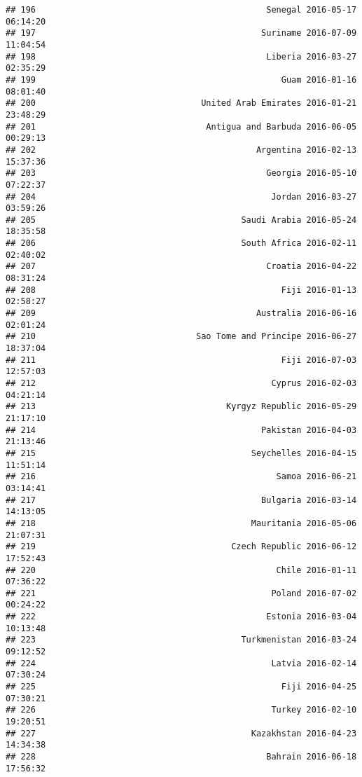 \documentclass[
]{article}
\begin{document}
\begin{verbatim}
## 196                                              Senegal 2016-05-17 06:14:20
## 197                                             Suriname 2016-07-09 11:04:54
## 198                                              Liberia 2016-03-27 02:35:29
## 199                                                 Guam 2016-01-16 08:01:40
## 200                                 United Arab Emirates 2016-01-21 23:48:29
## 201                                  Antigua and Barbuda 2016-06-05 00:29:13
## 202                                            Argentina 2016-02-13 15:37:36
## 203                                              Georgia 2016-05-10 07:22:37
## 204                                               Jordan 2016-03-27 03:59:26
## 205                                         Saudi Arabia 2016-05-24 18:35:58
## 206                                         South Africa 2016-02-11 02:40:02
## 207                                              Croatia 2016-04-22 08:31:24
## 208                                                 Fiji 2016-01-13 02:58:27
## 209                                            Australia 2016-06-16 02:01:24
## 210                                Sao Tome and Principe 2016-06-27 18:37:04
## 211                                                 Fiji 2016-07-03 12:57:03
## 212                                               Cyprus 2016-02-03 04:21:14
## 213                                      Kyrgyz Republic 2016-05-29 21:17:10
## 214                                             Pakistan 2016-04-03 21:13:46
## 215                                           Seychelles 2016-04-15 11:51:14
## 216                                                Samoa 2016-06-21 03:14:41
## 217                                             Bulgaria 2016-03-14 14:13:05
## 218                                           Mauritania 2016-05-06 21:07:31
## 219                                       Czech Republic 2016-06-12 17:52:43
## 220                                                Chile 2016-01-11 07:36:22
## 221                                               Poland 2016-07-02 00:24:22
## 222                                              Estonia 2016-03-04 10:13:48
## 223                                         Turkmenistan 2016-03-24 09:12:52
## 224                                               Latvia 2016-02-14 07:30:24
## 225                                                 Fiji 2016-04-25 07:30:21
## 226                                               Turkey 2016-02-10 19:20:51
## 227                                           Kazakhstan 2016-04-23 14:34:38
## 228                                              Bahrain 2016-06-18 17:56:32

\end{verbatim}
\end{document}
